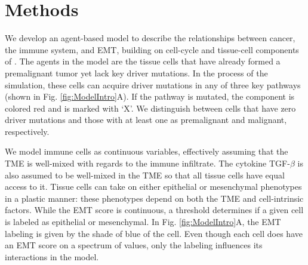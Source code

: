 \documentclass[11pt]{article}
\begin{document}
\section{Methods}
We develop an agent-based model to describe the relationships between cancer, the immune system, and EMT, building on cell-cycle and tissue-cell components of \cite{guo17_multiscale}. 
The agents in the model are the tissue cells that have already formed a premalignant tumor yet lack key driver mutations.
In the process of the simulation, these cells can acquire driver mutations in any of three key pathways (shown in Fig. \ref{fig:ModelIntro}A).
If the pathway is mutated, the component is colored red and is marked with `X'.
We distinguish between cells that have zero driver mutations and those with at least one as premalignant and malignant, respectively.
\par
We model immune cells as continuous variables, 
effectively assuming that the TME is well-mixed with regards to the immune infiltrate.
The cytokine TGF-$\beta$ is
also assumed to be well-mixed in the TME so that all tissue cells have equal access to it.
Tissue cells can take on either epithelial or mesenchymal phenotypes in a plastic manner: these phenotypes depend on both the TME and cell-intrinsic factors.
While the EMT score is continuous, a threshold determines if a given cell is labeled as epithelial or mesenchymal.
In Fig. \ref{fig:ModelIntro}A, the EMT labeling is given by the shade of blue of the cell.
Even though each cell does have an EMT score on a spectrum of values, only the labeling influences its interactions in the model.
\end{document}
